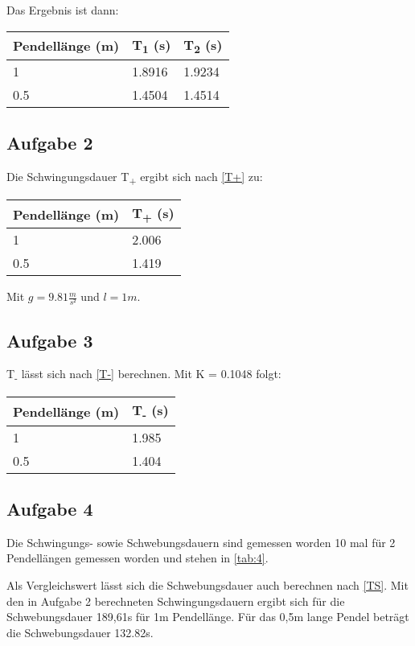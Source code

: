 \documentclass[titlepage=firstcover, captions=tableheading]{scrartcl}
\begin{document}
Das Ergebnis ist dann:

\begin{center}
    \begin{tabular}{lll}
        \toprule
        Pendellänge (m) & T\textsubscript{1} (s) & T\textsubscript{2} (s)\\
        \midrule 
        1 &1.8916 & 1.9234 \\
        0.5 & 1.4504 & 1.4514 \\
        \bottomrule
    \end{tabular}
\end{center}

\subsection{Aufgabe 2}

Die Schwingungsdauer T\textsubscript{+} ergibt sich nach \ref{T+} zu: 

\begin{center}
    \begin{tabular}{ll}
        \toprule
        Pendellänge (m) & T\textsubscript{+} (s) \\
        \midrule 
        1 & 2.006 \\
        0.5 & 1.419 \\
        \bottomrule
    \end{tabular}
\end{center}
Mit $g=9.81\frac{m}{s²}$ und $l=1m$.

\subsection{Aufgabe 3}

T\textsubscript{-} lässt sich nach \ref{T-} berechnen.
Mit K = 0.1048 folgt:
\begin{center}
    \begin{tabular}{ll}
        \toprule
        Pendellänge (m) & T\textsubscript{-} (s) \\
        \midrule 
        1 & 1.985 \\
        0.5 & 1.404 \\
        \bottomrule
    \end{tabular}
\end{center}

\subsection{Aufgabe 4}

Die Schwingungs- sowie Schwebungsdauern sind gemessen worden 10 mal für 2 Pendellängen gemessen worden und stehen in \ref{tab:4}.

Als Vergleichswert lässt sich die Schwebungsdauer auch berechnen nach \ref{TS}.
Mit den in Aufgabe 2 berechneten Schwingungsdauern ergibt sich für die Schwebungsdauer 189,61s für 1m Pendellänge.
Für das 0,5m lange Pendel beträgt die Schwebungsdauer 132.82s.
\end{document}
